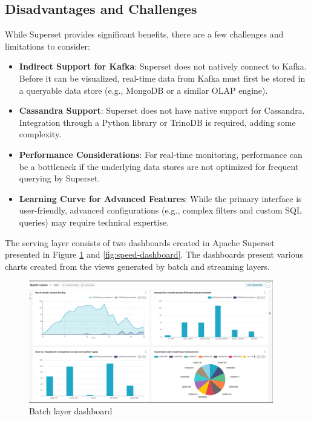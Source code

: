 \documentclass[12pt,a4paper, hidelinks]{article}
\begin{document}
\subsection{Disadvantages and Challenges}
While Superset provides significant benefits, there are a few challenges and limitations to consider:
\begin{itemize}
    \item \textbf{Indirect Support for Kafka}: Superset does not natively connect to Kafka. Before it can be visualized, real-time data from Kafka must first be stored in a queryable data store (e.g., MongoDB or a similar OLAP engine).
    \item \textbf{Cassandra Support}: Superset does not have native support for Cassandra. Integration through a Python library or TrinoDB is required, adding some complexity.
    \item \textbf{Performance Considerations}: For real-time monitoring, performance can be a bottleneck if the underlying data stores are not optimized for frequent querying by Superset.
    \item \textbf{Learning Curve for Advanced Features}: While the primary interface is user-friendly, advanced configurations (e.g., complex filters and custom SQL queries) may require technical expertise.
\end{itemize}
The serving layer consists of two dashboards created in Apache Superset presented in Figure \ref{fig:batch-dashboard} and \ref{fig:speed-dashboard}. The dashboards present various charts created from the views generated by batch and streaming layers.


\begin{figure}[H]
    \centering
    \includegraphics[width=0.95\textwidth]{images/superset-1.png}
    \caption{Batch layer dashboard}
    \label{fig:batch-dashboard}
\end{figure}
\end{document}
